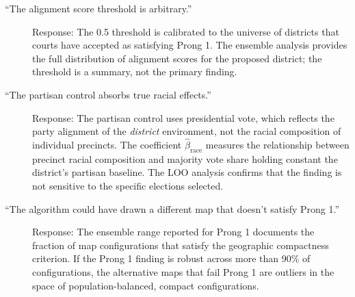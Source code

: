\begin{description}
  \item[``The alignment score threshold is arbitrary.'']
    Response: The 0.5 threshold is calibrated to the universe of districts
    that courts have accepted as satisfying Prong 1.  The ensemble analysis
    provides the full distribution of alignment scores for the proposed
    district; the threshold is a summary, not the primary finding.

  \item[``The partisan control absorbs true racial effects.'']
    Response: The partisan control uses presidential vote, which reflects
    the party alignment of the \emph{district} environment, not the racial
    composition of individual precincts.  The coefficient $\hat{\beta}_{\text{race}}$
    measures the relationship between precinct racial composition and
    majority vote share holding constant the district's partisan baseline.
    The LOO analysis confirms that the finding is not sensitive to the
    specific elections selected.

  \item[``The algorithm could have drawn a different map that doesn't satisfy Prong 1.'']
    Response: The ensemble range reported for Prong 1 documents the fraction
    of map configurations that satisfy the geographic compactness criterion.
    If the Prong 1 finding is robust across more than 90\% of configurations,
    the alternative maps that fail Prong 1 are outliers in the space of
    population-balanced, compact configurations.
\end{description}

